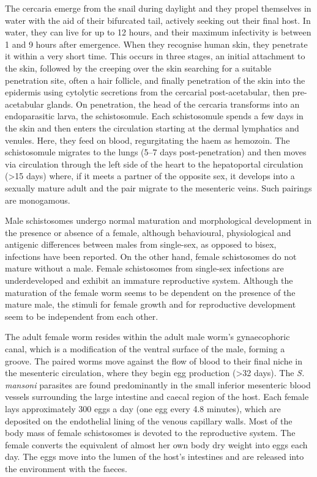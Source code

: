 The cercaria emerge from the snail during daylight and they propel
themselves in water with the aid of their bifurcated tail, actively
seeking out their final host. In water, they can live for up to 12
hours, and their maximum infectivity is between 1 and 9 hours after
emergence. When they recognise human skin, they penetrate it within a
very short time. This occurs in three stages, an initial attachment to
the skin, followed by the creeping over the skin searching for a
suitable penetration site, often a hair follicle, and finally
penetration of the skin into the epidermis using cytolytic secretions
from the cercarial post-acetabular, then pre-acetabular glands. On
penetration, the head of the cercaria transforms into an endoparasitic
larva, the schistosomule. Each schistosomule spends a few days in the
skin and then enters the circulation starting at the dermal lymphatics
and venules. Here, they feed on blood, regurgitating the haem as
hemozoin. The schistosomule migrates to the lungs (5--7 days
post-penetration) and then moves via circulation through the left side
of the heart to the hepatoportal circulation (\textgreater{}15 days)
where, if it meets a partner of the opposite sex, it develops into a
sexually mature adult and the pair migrate to the mesenteric veins. Such
pairings are monogamous.

Male schistosomes undergo normal maturation and morphological
development in the presence or absence of a female, although
behavioural, physiological and antigenic differences between males from
single-sex, as opposed to bisex, infections have been reported. On the
other hand, female schistosomes do not mature without a male. Female
schistosomes from single-sex infections are underdeveloped and exhibit
an immature reproductive system. Although the maturation of the female
worm seems to be dependent on the presence of the mature male, the
stimuli for female growth and for reproductive development seem to be
independent from each other.

The adult female worm resides within the adult male worm's gynaecophoric
canal, which is a modification of the ventral surface of the male,
forming a groove. The paired worms move against the flow of blood to
their final niche in the mesenteric circulation, where they begin egg
production (\textgreater{}32 days). The \emph{S. mansoni} parasites are found
predominantly in the small inferior mesenteric blood vessels surrounding
the large intestine and caecal region of the host. Each female lays
approximately 300 eggs a day (one egg every 4.8 minutes), which are
deposited on the endothelial lining of the venous capillary walls. Most
of the body mass of female schistosomes is devoted to the reproductive
system. The female converts the equivalent of almost her own body dry
weight into eggs each day. The eggs move into the lumen of the host's
intestines and are released into the environment with the faeces.

